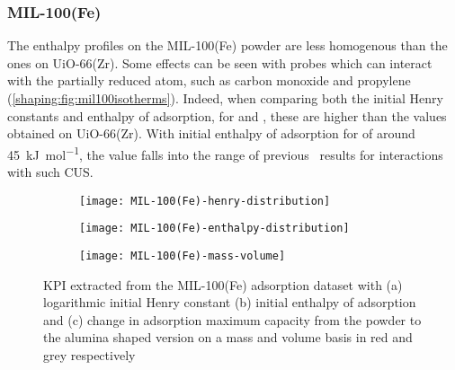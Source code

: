 
\subsubsection{MIL-100(Fe)}

The enthalpy profiles on the MIL-100(Fe) powder are less homogenous
than the ones on UiO-66(Zr). Some effects can be seen with probes which
can interact with the partially reduced  atom, such as
carbon monoxide and propylene (\autoref{shaping:fig:mil100isotherms}).
Indeed, when comparing both the initial Henry constants and
enthalpy of adsorption, for  and , these are
higher than the values obtained on UiO-66(Zr).
With initial enthalpy of adsorption for  of around
\SI{45}{\kilo\joule\per\mol}, the value falls into the range of
previous~\cite{yoonControlledReducibilityMetalOrganic2010}
results for interactions with such  CUS.

\begin{figure}[p]
	\centering
	\begin{subfigure}{\linewidth}
		\parbox[c]{0.1\linewidth}{\caption{}%
			\label{shaping:fig:analysismil100henry}}%
		\parbox[b]{0.8\linewidth}{%
			\texttt{[image: MIL-100(Fe)-henry-distribution]}%
		}%
	\end{subfigure}%

	\begin{subfigure}{\linewidth}
		\parbox[c]{0.1\linewidth}{\caption{}%
			\label{shaping:fig:analysismil100enth}}%
		\parbox[b]{0.8\linewidth}{%
			\texttt{[image: MIL-100(Fe)-enthalpy-distribution]}%
		}%
	\end{subfigure}%

	\begin{subfigure}{\linewidth}
		\parbox[c]{0.1\linewidth}{\caption{}%
			\label{shaping:fig:analysismil100basis}}%
		\parbox[b]{0.8\linewidth}{%
			\texttt{[image: MIL-100(Fe)-mass-volume]}%
		}%
	\end{subfigure}%

	\caption{\gls{KPI} extracted from the MIL-100(Fe) adsorption dataset with
		(a) logarithmic initial Henry constant (b) initial enthalpy of
		adsorption and (c) change in adsorption maximum capacity from the powder
		to the alumina shaped version on a mass and volume basis in red and grey
		respectively}%
	\label{shaping:fig:analysismil100}
\end{figure}

